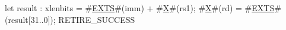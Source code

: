 let result : xlenbits = #\hyperref[sailRISCVzEXTS]{EXTS}#(imm) + #\hyperref[sailRISCVzX]{X}#(rs1);
#\hyperref[sailRISCVzX]{X}#(rd) = #\hyperref[sailRISCVzEXTS]{EXTS}#(result[31..0]);
RETIRE_SUCCESS
